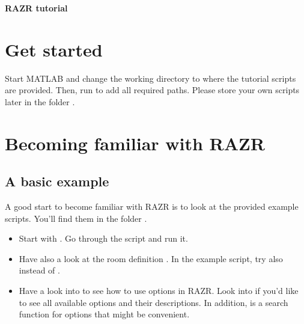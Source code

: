\documentclass[a4paper, fleqn, 11pt]{article}
\begin{document}
\sffamily
\begin{center}
\LARGE
\textbf{RAZR tutorial}\\[1em]
\normalsize
\end{center}

\vspace{1ex}

\section*{Get started}
Start MATLAB and change the working directory to where the tutorial scripts are provided. Then, run  to add all required paths. Please store your own scripts later in the folder .
\section*{Becoming familiar with RAZR}
\subsection{A basic example}
A good start to become familiar with RAZR is to look at the provided example scripts. You’ll find them in the folder .
\begin{itemize}
  \item Start with . Go through the script and run it.
  \item Have also a look at the room definition . In the example script, try also  instead of .
  \item Have a look into  to see how to use options in RAZR. Look into  if you’d like to see all available options and their descriptions. In addition,  is a search function for options that might be convenient.
\end{itemize}

\end{document}
